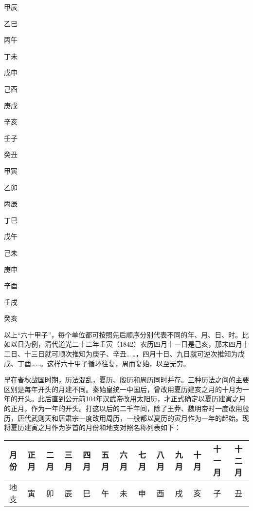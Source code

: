 \documentclass[a5paper,oneside,12pt]{ctexbook}
\newcommand*{\circled}[1]{\ifthenelse{#1 > 10}{\lower.7ex\hbox{\tikz\draw (0pt, 0pt) circle (.5em) node {\makebox[1em][c]{\footnotesize #1}};}}{\lower.7ex\hbox{\tikz\draw (0pt, 0pt) circle (.5em) node {\makebox[1em][c]{\small #1}};}}}
\begin{document}
\begin{enumerate*}[label=\circled{\arabic*}, afterlabel={}, itemjoin= \qquad]
\item 甲辰 \item 乙巳 \item 丙午 \item 丁未 \item 戊申\\
\item 己酉 \item 庚戌 \item 辛亥 \item 壬子 \item 癸丑\\
\item 甲寅 \item 乙卯 \item 丙辰 \item 丁巳 \item 戊午\\
\item 己未 \item 庚申 \item 辛酉 \item 壬戌 \item 癸亥
\end{enumerate*}
    
以上“六十甲子”，每个单位都可按照先后顺序分别代表不同的年、月、日、时。比如以日为例，清代道光二十二年壬寅（1842）农历四月十一日是己亥，那末四月十二日、十三日就可顺次推知为庚子、辛丑……，四月十日、九日就可逆次推知为戊戌、丁酉……。这样六十甲子循环往复，周而复始，以至无穷。

早在春秋战国时期，历法混乱，夏历、殷历和周历同时并存。三种历法之间的主要区别是每年开头的月建不同。秦始皇统一中国后，曾改用夏历建亥之月的十月为一年的开头。此后直到公元前104年汉武帝改用太阳历，才正式确定以夏历建寅之月的正月，作为一年的开头。打这以后的二千年间，除了王莽、魏明帝时一度改用殷历，唐代武则天和唐肃宗一度改用周历，一般都以夏历的寅月作为一年的起始。现将夏历建寅之月作为岁首的月份和地支对照名称列表如下：

\begin{table}[H]
\setlength{\tabcolsep}{0.2em} %
\centering\footnotesize
\begin{tabular}{*{12}{c|}c} %
\hline
月份&正月&二月&三月&四月&五月&六月&七月&八月&九月&十月&十一月&十二月\\
\hline
地支&寅&卯&辰&巳&午&未&申&酉&戌&亥&子&丑\\
\hline
\end{tabular}
\end{table}
\end{document}
